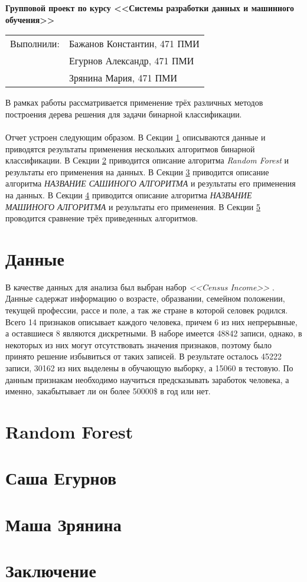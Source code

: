\documentclass[12pt,a4paper]{article}
\begin{document}
\begin{center}
    \Large \bf Групповой проект по курсу <<Системы разработки данных и машинного обучения>>
\end{center}

\begin{flushleft}
    \begin{tabular}[H]{ll}
        Выполнили: & Бажанов Константин, 471 ПМИ\\
        &Егурнов Александр, 471 ПМИ\\
        &Зрянина Мария, 471 ПМИ\\
    \end{tabular}
\end{flushleft}

В рамках работы рассматривается применение трёх различных методов построения дерева решения для задачи бинарной классификации.\\\\
Отчет устроен следующим образом. В Секции \ref{sec:data} описываются данные и приводятся результаты применения нескольких алгоритмов бинарной классификации.
В Секции \ref{sec:randomforest} приводится описание алгоритма {\it Random Forest} и результаты его применения на данных.
В Секции \ref{sec:sashaegurnov} приводится описание алгоритма {\it НАЗВАНИЕ САШИНОГО АЛГОРИТМА} и результаты его применения на данных.
В Секции \ref{sec:mashazryanina} приводится описание алгоритма {\it НАЗВАНИЕ МАШИНОГО АЛГОРИТМА} и результаты его применения.
В Секции \ref{sec:conclusion} проводится сравнение трёх приведенных алгоритмов.

\section{Данные}
\label{sec:data}

В качестве данных для анализа был выбран набор {\it <<Census Income>>} \cite{Kohavi+Becker:1996}.
Данные садержат информацию о возрасте, образвании, семейном положении, текущей профессии, рассе и поле, а так же стране в которой селовек родился.
Всего 14 признаков описывает каждого человека, причем 6 из них непрерывные, а оставшиеся 8 являются дискретными.
В наборе имеется 48842 записи, однако, в некоторых из них могут отсутствовать значения признаков, поэтому было принято решение избывиться от таких записей.
В результате осталось 45222 записи, 30162 из них выделены в обучающую выборку, а 15060 в тестовую.
По данным признакам необходимо научиться предсказывать заработок человека, а именно, закабытывает ли он более 50000\$ в год или нет.

\section{Random Forest}
\label{sec:randomforest}

\section{Саша Егурнов}
\label{sec:sashaegurnov}

\section{Маша Зрянина}
\label{sec:mashazryanina}

\section{Заключение}
\label{sec:conclusion}



\end{document}
